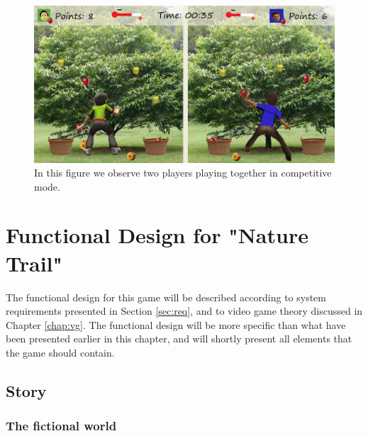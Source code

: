 \begin{figure} [H]
\centering
\includegraphics[scale=0.075]{gameapple2playerEngelsk.jpg}
\caption[Picking apples - multi-player]{In this figure we observe two players playing together in competitive mode.}
\label{fig:appleMultiplayer}
\end{figure}


\section{Functional Design for "Nature Trail"}
\label{subsec:designnature}
The functional design for this game will be described according to system requirements presented in Section \ref{sec:req}, and to video game theory discussed in Chapter \ref{chap:vg}. The functional design will be more specific than what have been presented earlier in this chapter, and will shortly present all elements that the game should contain.

\subsection{Story} 

\subsubsection{The fictional world} 

